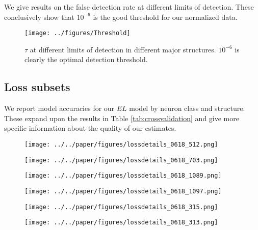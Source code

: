 We give results on the false detection rate at different limits of detection.
These conclusively show that $10^{-6}$ is the good threshold for our normalized data.
\begin{figure}[H]
    \centering
    \texttt{[image: ../figures/Threshold]}
    \label{fig:threshold}
    \caption{$\tau$ at different limits of detection in different major structures.  $10^{-6}$ is clearly the optimal detection threshold.}
\end{figure}

\newpage

\subsection{Loss subsets}
\label{supp_sec:loss_subsets}

We report model accuracies for our $EL$ model by neuron class and structure.
These expand upon the results in Table \ref{tab:crossvalidation} and give more specific information about the quality of our estimates. 

\begin{figure}[H]
    \centering
    \texttt{[image: ../../paper/figures/lossdetails\_0618\_512.png]} 
    \label{fig:distances}
    \caption{}
\end{figure}

\begin{figure}[H]
    \centering
    \texttt{[image: ../../paper/figures/lossdetails\_0618\_703.png]} 
    \label{fig:distances}
    \caption{}
\end{figure}

\begin{figure}[H]
    \centering
    \texttt{[image: ../../paper/figures/lossdetails\_0618\_1089.png]} 
    \label{fig:distances}
    \caption{}
\end{figure}

\begin{figure}[H]
    \centering
    \texttt{[image: ../../paper/figures/lossdetails\_0618\_1097.png]} 
    \label{fig:distances}
    \caption{}
\end{figure}

\begin{figure}[H]
    \centering
    \texttt{[image: ../../paper/figures/lossdetails\_0618\_315.png]} 
    \label{fig:distances}
    \caption{}
\end{figure}

\begin{figure}[H]
    \centering
    \texttt{[image: ../../paper/figures/lossdetails\_0618\_313.png]} 
    \label{fig:distances}
    \caption{}
\end{figure}

